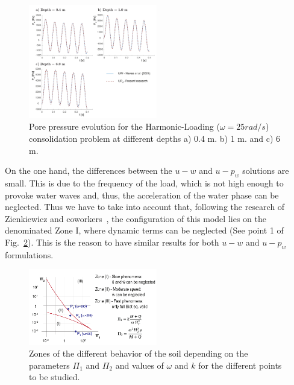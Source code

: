 \documentclass[twocolumn]{svjour3}          %
\begin{document}
\begin{figure}
\begin{center}
\includegraphics[width=0.5\textwidth]{Fig/fig_cyc.pdf}
\caption{Pore pressure evolution for the Harmonic-Loading ($\omega=25 rad/s$) consolidation problem at different depths a) 0.4 m. b) 1 m. and c) 6 m.}
\label{fig_con3}
\end{center}
\end{figure}

On the one hand, the differences between the $u-w$ and $u-p_w$ solutions are small. This is due to the frequency of the load, which is not high enough to provoke water waves and, thus, the acceleration of the water phase can be neglected. Thus we have to take into account that, following the research of Zienkiewicz and coworkers~\cite{zienkiewicz1990a}, the configuration of this model lies on the denominated Zone I, where dynamic terms can be neglected (See point 1 of Fig.~\ref{fig_ZK}). This is the reason to have similar results for both $u-w$ and $u-p_w$ formulations. 
\begin{figure}
\begin{center}
\includegraphics[width=0.5\textwidth]{Fig/zienk.pdf}
\caption{Zones of the different behavior of the soil depending on the parameters $\Pi_1$ and $\Pi_2$ and values of $\omega$ and $k$ for the different points to be studied.}
\label{fig_ZK}
\end{center}
\end{figure}
\end{document}
